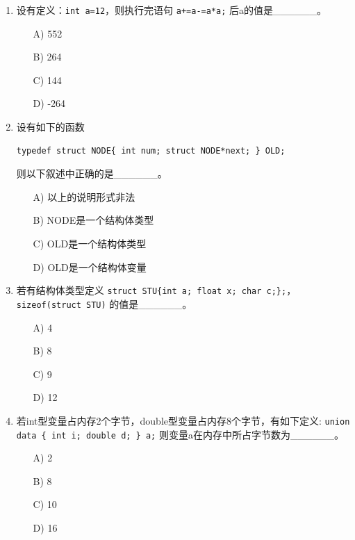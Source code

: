 \documentclass[a4paper,12pt]{article}
\begin{document}
\begin{enumerate}
	\item 设有定义：\texttt{int a=12}，则执行完语句 \texttt{a+=a-=a*a;} 后a的值是\_\_\_\_\_\_。
	      \begin{enumerate}
		      \item[A)] 552
		      \item[B)] 264
		      \item[C)] 144
		      \item[D)] -264
	      \end{enumerate}
	      \vspace{0.3cm}

	\item 设有如下的函数
	      \begin{verbatim}
typedef struct NODE{ int num; struct NODE*next; } OLD;
    \end{verbatim}
	      则以下叙述中正确的是\_\_\_\_\_\_。
	      \begin{enumerate}
		      \item[A)] 以上的说明形式非法
		      \item[B)] NODE是一个结构体类型
		      \item[C)] OLD是一个结构体类型
		      \item[D)] OLD是一个结构体变量
	      \end{enumerate}
	      \vspace{0.3cm}

	\item 若有结构体类型定义 \texttt{struct STU\{int a; float x; char c;\};}，\texttt{sizeof(struct STU)} 的值是\_\_\_\_\_\_。
	      \begin{enumerate}
		      \item[A)] 4
		      \item[B)] 8
		      \item[C)] 9
		      \item[D)] 12
	      \end{enumerate}
	      \vspace{0.3cm}

	\item 若int型变量占内存2个字节，double型变量占内存8个字节，有如下定义: \texttt{union data \{ int i; double d; \} a;} 则变量a在内存中所占字节数为\_\_\_\_\_\_。
	      \begin{enumerate}
		      \item[A)] 2
		      \item[B)] 8
		      \item[C)] 10
		      \item[D)] 16
	      \end{enumerate}
	      \vspace{0.3cm}


\end{enumerate}
\end{document}
